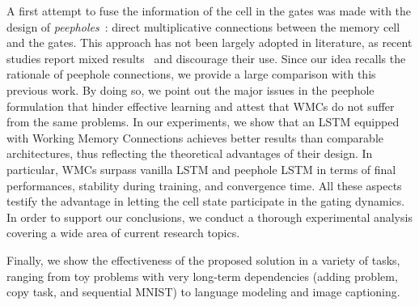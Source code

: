 A first attempt to fuse the information of the cell in the gates was made with the design of \textit{peepholes}~\citep{gers2000recurrent}: direct multiplicative connections between the memory cell and the gates. This approach has not been largely adopted in literature, as recent studies report mixed results~\citep{Greff2017LSTMAS} and discourage their use. Since our idea recalls the rationale of peephole connections, we provide a large comparison with this previous work. By doing so, we point out the major issues in the peephole formulation that hinder effective learning and attest that WMCs do not suffer from the same problems.
In our experiments, we show that an LSTM equipped with Working Memory Connections achieves better results than comparable architectures, thus reflecting the theoretical advantages of their design. In particular, WMCs surpass vanilla LSTM and peephole LSTM in terms of final performances, stability during training, and convergence time. All these aspects testify the advantage in letting the cell state participate in the gating dynamics. In order to support our conclusions, we conduct a thorough experimental analysis covering a wide area of current research topics.

 Finally, we show the effectiveness of the proposed solution in a variety of tasks, ranging from toy problems with very long-term dependencies (adding problem, copy task, and sequential MNIST) to language modeling and image captioning.
